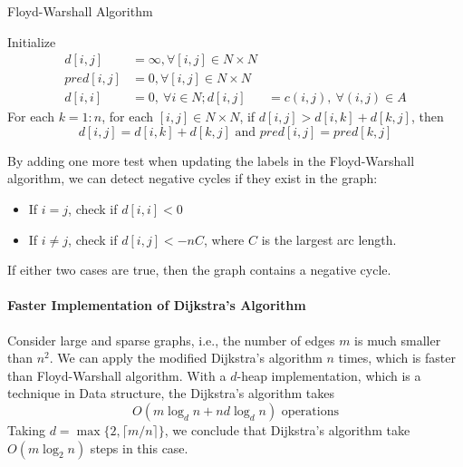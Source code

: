 \begin{algorithm}[htb] 
\caption{Floyd-Warshall Algorithm} 
\label{alg:SM} 
\begin{algorithmic}[1] %
\STATE 
Initialize 
\begin{align*}
d[i,j]&=\infty,\forall[i,j]\in N\times N\\
pred[i,j]&=0,\forall [i,j]\in N\times N\\
d[i,i]&=0,\ \forall i\in N;
d[i,j]&=c(i,j),\ \forall (i,j)\in A
\end{align*}
\STATE
For each $k=1:n$, for each $[i,j]\in N\times N$, if $d[i,j]>d[i,k]+d[k,j]$, then
\[
d[i,j]=d[i,k]+d[k,j]\text{ and }pred[i,j]=pred[k,j]
\]
\end{algorithmic}
\end{algorithm}
\begin{remark}
By adding one more test when updating the labels in the Floyd-Warshall algorithm, we can detect negative cycles if they exist in the graph:
\begin{itemize}
\item
If $i=j$, check if $d[i,i]<0$
\item
If $i\ne j$, check if $d[i,j]<-nC$, where $C$ is the largest arc length.
\end{itemize}
If either two cases are true, then the graph contains a negative cycle.
\end{remark}

\paragraph{Faster Implementation of Dijkstra’s Algorithm}
Consider large and sparse graphs, i.e., the number of edges $m$ is much smaller than $n^2$.
We can apply the modified Dijkstra’s algorithm $n$ times, which is faster than Floyd-Warshall algorithm.
With a $d$-heap implementation, which is a technique in Data structure, the Dijkstra’s algorithm takes
\[
O(m\log_dn+nd\log_dn)\text{ operations}
\]
Taking $d=\max\{2,\lceil m/n\rceil\}$, we conclude that Dijkstra’s algorithm take $O(m\log_2n)$ steps in this case.













